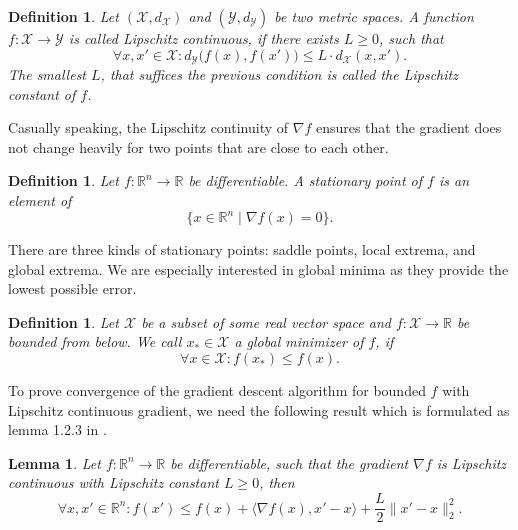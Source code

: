 \documentclass[11pt, a4paper]{article}
\newtheorem{lemma}[theorem]{Lemma}
\newtheorem{definition}[theorem]{Definition}
\newcommand{\R}{\mathbb{R}}
\newcommand{\X}{\mathcal{X}}
\newcommand{\Y}{\mathcal{Y}}
\begin{document}
\begin{definition}
Let $(\X,d_{\X})$ and $(\Y, d_{\Y})$ be two metric spaces. A function $f: \X \to \Y$ is called Lipschitz continuous, if there exists $L \geq 0$, such that
\[ \forall x,x' \in \X : d_{\Y} \big ( f(x) , f(x') \big ) \leq L \cdot d_{\X}(x,x'). \]
The smallest $L$, that suffices the previous condition is called the Lipschitz constant of $f$.
\end{definition}

Casually speaking, the Lipschitz continuity of $\nabla f$ ensures that the gradient does not change heavily for two points that are close to each other.

\begin{definition}
Let $f: \R^n \to \R$ be differentiable. A stationary point of $f$ is an element of
\[ \big \{ x \in \R^n \mid \nabla f(x) = 0 \big \}. \]
\end{definition}

There are three kinds of stationary points: saddle points, local extrema, and global extrema. We are especially interested in global minima as they provide the lowest possible error.

\begin{definition}
Let $\X$ be a subset of some real vector space and $f: \X \to \R$ be bounded from below. We call $x_* \in \X$ a global minimizer of $f$, if
\[ \forall x \in \X : f(x_*) \leq f(x). \]
\end{definition}

To prove convergence of the gradient descent algorithm for bounded $f$ with Lipschitz continuous gradient, we need the following result which is formulated as lemma 1.2.3 in \cite{ConvexOptimization}.

\begin{lemma} \label{lem:descent}
Let $f: \R^n \to \R$ be differentiable, such that the gradient $\nabla f$ is Lipschitz continuous with Lipschitz constant $L \geq 0$, then
\[ \forall x,x' \in \R^n : f(x') \leq f(x) + \big \langle \nabla f(x) , x' -x \big \rangle + \frac{L}{2} \big \| x'- x \big \|_2^2. \]
\end{lemma}
\end{document}
